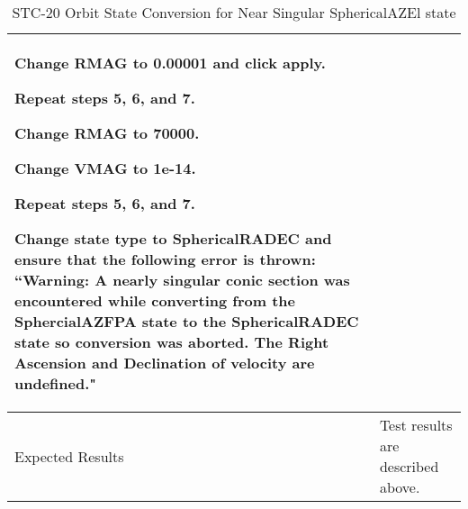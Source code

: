 \begin{table}[htbp!]
\begin{tabular}{|p{1.05 in} |p{4.75 in} |}
\begin{compactenum}
                 \item Change RMAG to 0.00001 and click apply.
                 \item Repeat steps 5, 6, and 7.
                 \item Change RMAG to 70000.
                 \item Change VMAG to 1e-14.
                 \item Repeat steps 5, 6, and 7.
                 \item Change state type to SphericalRADEC and ensure that the following error is thrown: ``Warning: A nearly singular conic section was encountered while converting from the SphercialAZFPA state to the SphericalRADEC state so conversion was aborted.  The Right Ascension and Declination of velocity are undefined."
         \end{compactenum}
         \\ \hline
         Expected Results & Test results are described above.\\
      \hline
      \end{tabular}
      \label{Table:STC-20}
      \caption{STC-20 Orbit State Conversion for Near Singular SphericalAZEl state}
\end{table}

